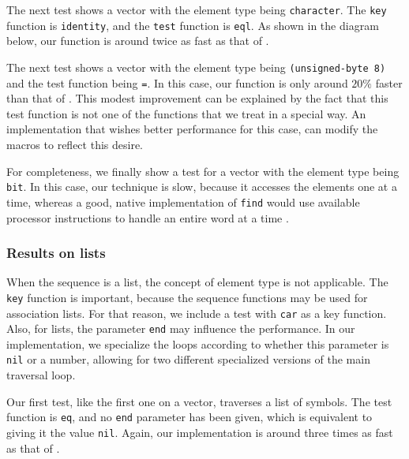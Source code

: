 
The next test shows a vector with the element type being
\texttt{character}.  The \texttt{key} function is \texttt{identity},
and the \texttt{test} function is \texttt{eql}.  As shown in the
diagram below, our function is around twice as fast as that of
\sbcl{}.


The next test shows a vector with the element type being
\texttt{(unsigned-byte 8)} and the test function being \texttt{=}.  In
this case, our function is only around $20\%$ faster than that of
\sbcl{}.  This modest improvement can be explained by the fact that
this test function is not one of the functions that we treat in a
special way.  An implementation that wishes better performance for
this case, can modify the macros to reflect this desire.


For completeness, we finally show a test for a vector with the element
type being \texttt{bit}.  In this case, our technique is slow, because
it accesses the elements one at a time, whereas a good, native
implementation of \texttt{find} would use available processor
instructions to handle an entire word at a time
\cite{Baker:1990:EIB:121989.121991}.


\subsubsection{Results on lists}

When the sequence is a list, the concept of element type is not
applicable.  The \texttt{key} function is important, because the
sequence functions may be used for association lists.  For that
reason, we include a test with \texttt{car} as a key function.  Also,
for lists, the parameter \texttt{end} may influence the performance.
In our implementation, we specialize the loops according to whether
this parameter is \texttt{nil} or a number, allowing for two different
specialized versions of the main traversal loop.

Our first test, like the first one on a vector, traverses a list of
symbols.  The test function is \texttt{eq}, and no \texttt{end}
parameter has been given, which is equivalent to giving it the value
\texttt{nil}.  Again, our implementation is around three times as fast
as that of \sbcl{}.

